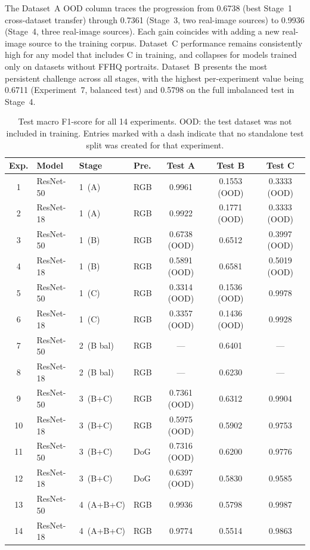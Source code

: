 The Dataset~A OOD column traces the progression from 0.6738 (best Stage~1 cross-dataset
transfer) through 0.7361 (Stage~3, two real-image sources) to 0.9936 (Stage~4, three
real-image sources). Each gain coincides with adding a new real-image source to the
training corpus. Dataset~C performance remains consistently high for any model that
includes C in training, and collapses for models trained only on datasets without FFHQ
portraits. Dataset~B presents the most persistent challenge across all stages, with the
highest per-experiment value being 0.6711 (Experiment~7, balanced test) and 0.5798 on
the full imbalanced test in Stage~4.

\begin{table}[h!]
  \centering
  \caption{Test macro F1-score for all 14 experiments. OOD: the test dataset was not
           included in training. Entries marked with a dash indicate that no
           standalone test split was created for that experiment.}
  \label{tab:all_experiments}
  \begin{tabular}{clllccc}
    \hline
    \textbf{Exp.} & \textbf{Model} & \textbf{Stage} & \textbf{Pre.} &
    \textbf{Test A} & \textbf{Test B} & \textbf{Test C} \\
    \hline
    1  & ResNet-50 & 1~(A)     & RGB & 0.9961          & 0.1553 (OOD) & 0.3333 (OOD) \\
    2  & ResNet-18 & 1~(A)     & RGB & 0.9922          & 0.1771 (OOD) & 0.3333 (OOD) \\
    3  & ResNet-50 & 1~(B)     & RGB & 0.6738 (OOD)   & 0.6512        & 0.3997 (OOD) \\
    4  & ResNet-18 & 1~(B)     & RGB & 0.5891 (OOD)   & 0.6581        & 0.5019 (OOD) \\
    5  & ResNet-50 & 1~(C)     & RGB & 0.3314 (OOD)   & 0.1536 (OOD) & 0.9978       \\
    6  & ResNet-18 & 1~(C)     & RGB & 0.3357 (OOD)   & 0.1436 (OOD) & 0.9928       \\
    7  & ResNet-50 & 2~(B bal) & RGB & ---             & 0.6401        & ---          \\
    8  & ResNet-18 & 2~(B bal) & RGB & ---             & 0.6230        & ---          \\
    9  & ResNet-50 & 3~(B+C)   & RGB & 0.7361 (OOD)   & 0.6312        & 0.9904       \\
    10 & ResNet-18 & 3~(B+C)   & RGB & 0.5975 (OOD)   & 0.5902        & 0.9753       \\
    11 & ResNet-50 & 3~(B+C)   & DoG & 0.7316 (OOD)   & 0.6200        & 0.9776       \\
    12 & ResNet-18 & 3~(B+C)   & DoG & 0.6397 (OOD)   & 0.5830        & 0.9585       \\
    13 & ResNet-50 & 4~(A+B+C) & RGB & 0.9936          & 0.5798        & 0.9987       \\
    14 & ResNet-18 & 4~(A+B+C) & RGB & 0.9774          & 0.5514        & 0.9863       \\
    \hline
  \end{tabular}
\end{table}

